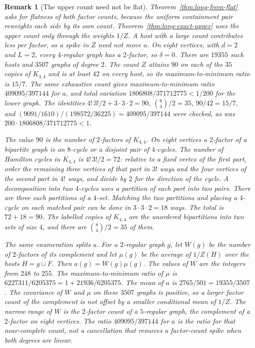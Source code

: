 \documentclass[11pt]{article}
\newtheorem{remark}[theorem]{Remark}
\begin{document}
\begin{remark}[The upper count need not be flat]
\label{rem:exact-upper-eight}
Theorem~\ref{thm:long-from-flat} asks for flatness of both factor counts, because
the uniform containment pair reweights each side by its own count.
Theorem~\ref{thm:long-exact-upper} uses the upper count only through the
weights \(1/Z\). A host with a large count contributes less per factor, so a
spike in \(Z\) need not move \(a\).
On eight vertices, with \(d=2\) and \(L=2\), every \(4\)-regular graph has a
\(2\)-factor, so \(\delta=0\). There are \(19355\) such hosts and \(3507\)
graphs of degree \(2\). The count \(Z\) attains \(90\) on each of the \(35\)
copies of \(K_{4,4}\) and is at least \(42\) on every host, so its maximum-to-minimum
ratio is \(15/7\). The same exhaustive count gives maximum-to-minimum ratio
\(409095/397144\) for \(a\), and total variation \(1806808/371712775<1/200\) for
the lower graph. The identities \(4!\,3!/2+3\cdot 3\cdot 2=90\),
\(\binom{8}{4}/2=35\), \(90/42=15/7\), and
\((9091/1610)/(198572/36225)=409095/397144\) were checked, as was
\(200\cdot 1806808/371712775<1\).

The value \(90\) is the number of \(2\)-factors of \(K_{4,4}\).
On eight vertices a \(2\)-factor of a bipartite graph is an \(8\)-cycle or a
disjoint pair of \(4\)-cycles.
The number of Hamilton cycles in \(K_{4,4}\) is \(4!\,3!/2=72\): relative to a
fixed vertex of the first part, order the remaining three vertices of that part
in \(3!\) ways and the four vertices of the second part in \(4!\) ways, and divide
by \(2\) for the direction of the cycle.
A decomposition into two \(4\)-cycles uses a partition of each part into two
pairs. There are three such partitions of a \(4\)-set. Matching the two
partitions and placing a \(4\)-cycle on each matched pair can be done in
\(3\cdot 3\cdot 2=18\) ways.
The total is \(72+18=90\).
The labelled copies of \(K_{4,4}\) are the unordered bipartitions into two sets
of size \(4\), and there are \(\binom{8}{4}/2=35\) of them.

The same enumeration splits \(a\). For a \(2\)-regular graph \(g\), let \(W(g)\)
be the number of \(2\)-factors of its complement and let \(\mu(g)\) be the
average of \(1/Z(H)\) over the hosts \(H=g\cup F\). Then \(a(g)=W(g)\mu(g)\).
The values of \(W\) are the integers from \(248\) to \(255\). The
maximum-to-minimum ratio of \(\mu\) is \(6227311/6205375=1+21936/6205375\).
The mean of \(a\) is \(2765/501=19355/3507\). The covariance of \(W\) and \(\mu\)
on these \(3507\) graphs is positive, so a larger factor count of the
complement is not offset by a smaller conditional mean of \(1/Z\). The narrow
range of \(W\) is the \(2\)-factor count of a \(5\)-regular graph, the
complement of a \(2\)-factor on eight vertices. The ratio
\(409095/397144\) for \(a\) is the ratio for that near-complete count, not a
cancellation that removes a factor-count spike when both degrees are linear.
\end{remark}
\end{document}
